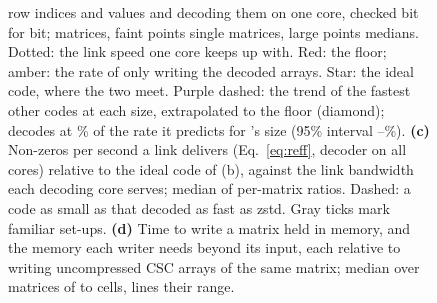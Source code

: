 \begin{figure}[tbp]
{row indices and values and decoding them on one core, checked bit for bit;  matrices, faint points single
matrices, large points medians. Dotted: the link speed one core keeps up with. Red: the floor; amber: the rate of
only writing the decoded arrays. Star: the ideal code, where the two meet. Purple dashed: the trend of the fastest other
codes at each size, extrapolated to the floor (diamond); \sone{}
decodes at \% of the rate it predicts for \sone's size (95\% interval
--\%).
\textbf{(c)} Non-zeros per second a link delivers (Eq.~\ref{eq:reff}, decoder on all cores) relative to the ideal code of
(b), against the link bandwidth each decoding core serves; median of per-matrix ratios. Dashed: a code as small as
\sone{} that decoded as fast as zstd. Gray ticks mark familiar set-ups.
\textbf{(d)} Time to write a matrix held in memory, and the memory each writer needs beyond its input, each relative to
writing uncompressed CSC arrays of the same matrix; median over  matrices of
 to  cells, lines their range.}
\label{fig:floor}
\end{figure}
